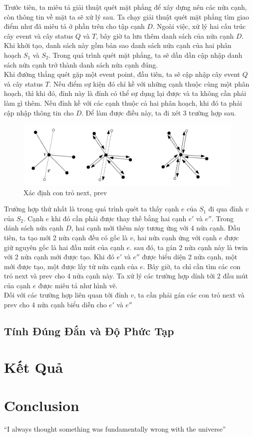 \documentclass[15pt]{article}
\begin{document}
Trước tiên, ta miêu tả giải thuật quét mặt phẳng để xây dựng nên các nửa cạnh, còn thông tin về mặt ta sẽ xử lý sau. Ta chạy giải thuật quét mặt phẳng tìm giao điểm như đã miêu tả ở phần trên cho tập cạnh $D$. Ngoài việc, xử lý hai cấu trúc cây event và cây status $Q$ và $T$, bây giờ ta lưu thêm danh sách của nửa cạnh $D$. Khi khởi tạo, danh sách này gồm bản sao danh sách nửa cạnh của hai phân hoạch $S_1$ và $S_2$. Trong quá trình quét mặt phẳng, ta sẽ dần dần cập nhập danh sách nửa cạnh trở thành danh sách nửa cạnh đúng. \\

Khi đường thẳng quét gặp một event point, đầu tiên, ta sẽ cập nhập cây event $Q$ và cây status $T$. Nếu điểm sự kiện đó chỉ kề với những cạnh thuộc cùng một phân hoạch, thì khi đó, đỉnh này là đỉnh có thể sự dụng lại được và ta không cần phải làm gì thêm. Nếu đỉnh kề với các cạnh thuộc cả hai phân hoạch, khi đó ta phải cập nhập thông tin cho $D$. Để làm được điều này, ta đi xét 3 trường hợp sau. \\

\begin{figure}[h!]
\centering
\includegraphics[scale=0.5]{./vertex_from_subdivisions.png}
\caption{Xác định con trỏ next, prev}
\label{fig: giao hai phân hoạch}
\end{figure}

Trường hợp thứ nhất là trong quá trình quét ta thấy cạnh $e$ của $S_1$ đi qua đỉnh $v$ của $S_2$. Cạnh $e$ khi đó cần phải được thay thế bằng hai cạnh $e'$ và $e''$. Trong dánh sách nửa cạnh $D$, hai cạnh mới thêm này tương ứng với 4 nửa cạnh. Đầu tiên, ta tạo mới 2 nửa cạnh đều có gốc là $v$, hai nửa cạnh ứng với cạnh $e$ được giữ nguyên gốc là hai đầu mút của cạnh $e$. sau đó, ta gán 2 nửa cạnh này là twin với 2 nửa cạnh mới được tạo. Khi đó $e'$ và $e''$ được biểu diện 2 nửa cạnh, một mới được tạo, một được lấy từ nửa cạnh của $e$. Bây giờ, ta chỉ cần tìm các con trỏ next và prev cho 4 nửa cạnh này. Ta xử lý các trường hợp dính tới 2 đầu mút của cạnh $e$ được miêu tả như hình vẽ. \\

Đối với các trường hợp liên quan tới đỉnh $v$, ta cần phải gán các con trỏ next và prev cho 4 nửa cạnh biểu diễn cho $e'$ và $e''$

\subsection{Tính Đúng Đắn và Độ Phức Tạp}
\section{Kết Quả}
\section{Conclusion}
``I always thought something was fundamentally wrong with the universe'' \citep{adams1995hitchhiker}



\end{document}
